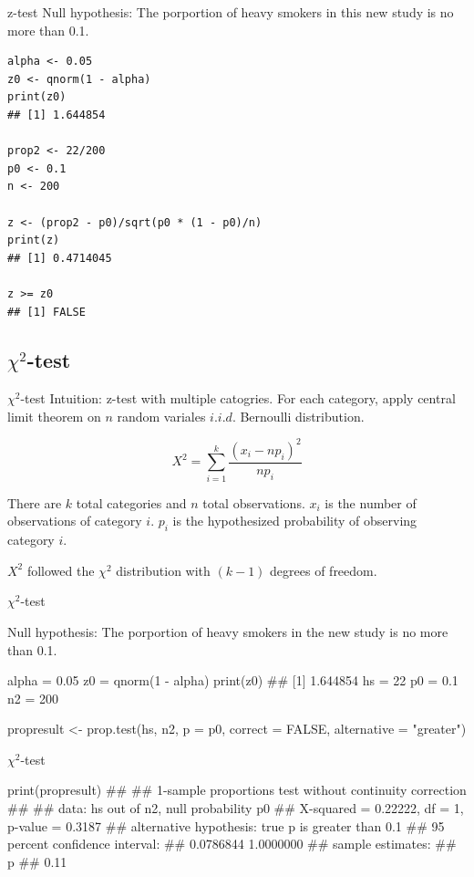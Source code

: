 \documentclass[12pt, t, xcolor=dvipsnames]{beamer}
\begin{document}
\begin{frame}[fragile]{z-test}
Null hypothesis: The porportion of heavy smokers in this new study is no more than 0.1. 

\begin{verbatim}
alpha <- 0.05
z0 <- qnorm(1 - alpha)
print(z0)
## [1] 1.644854

prop2 <- 22/200
p0 <- 0.1
n <- 200

z <- (prop2 - p0)/sqrt(p0 * (1 - p0)/n)
print(z)
## [1] 0.4714045

z >= z0
## [1] FALSE
\end{verbatim}
\end{frame}

\subsection{\texorpdfstring{$\chi^2$}{chi-squared}-test}

\begin{frame}[fragile]{$\chi^2$-test}
Intuition: z-test with multiple catogries. For each category, apply central limit theorem on $n$ random variales $i.i.d.$ Bernoulli distribution.

$$X^2 = \sum_{i=1}^{k}\frac{(x_i - n p_i)^2}{n p_i}$$

There are $k$ total categories and $n$ total observations. $x_i$ is the number of observations of category $i$. $p_i$ is the hypothesized probability of observing category $i$. 

$X^{2}$ followed the $\chi^{2}$ distribution with $(k-1)$ degrees of freedom.
 

\end{frame}

\begin{frame}[fragile]{$\chi^2$-test}

Null hypothesis: The porportion of heavy smokers in the new study is no more than 0.1. 

\begin{Rcode}
alpha = 0.05
z0 = qnorm(1 - alpha)
print(z0)
## [1] 1.644854
hs = 22
p0 = 0.1
n2 = 200

propresult <- prop.test(hs, n2, p = p0, correct = FALSE, 
                        alternative = "greater")
\end{Rcode}
\end{frame}

\begin{frame}[fragile]{$\chi^2$-test}

\begin{Rcode}
print(propresult)
## 
##  1-sample proportions test without continuity correction
## 
## data:  hs out of n2, null probability p0
## X-squared = 0.22222, df = 1, p-value = 0.3187
## alternative hypothesis: true p is greater than 0.1
## 95 percent confidence interval:
##  0.0786844 1.0000000
## sample estimates:
##    p 
## 0.11
\end{Rcode}
\end{frame}
\end{document}

